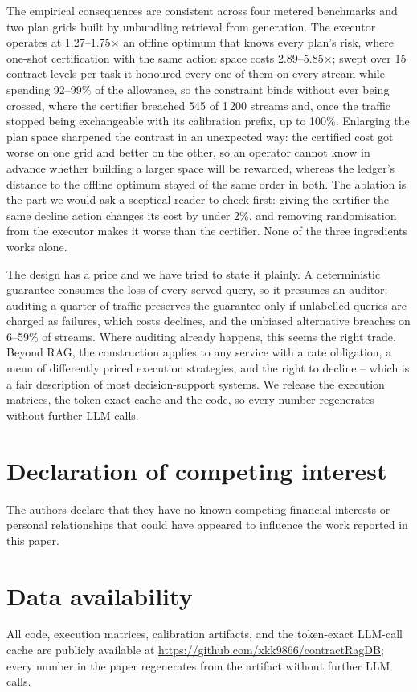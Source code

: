 \documentclass[a4paper,fleqn]{cas-dc}
\begin{document}
The empirical consequences are consistent across four metered benchmarks
and two plan grids built by unbundling retrieval from generation. The
executor operates at 1.27--1.75$\times$ an offline optimum that knows
every plan's risk, where one-shot certification with the same action
space costs 2.89--5.85$\times$; swept over 15 contract levels per task
it honoured every one of them on every stream while spending 92--99\%
of the allowance, so the constraint binds without ever being crossed,
where the certifier breached 545 of 1\,200 streams and, once the traffic
stopped being exchangeable with its calibration prefix, up to 100\%. Enlarging the plan space
sharpened the contrast in an unexpected way: the certified cost got
worse on one grid and better on the other, so an operator cannot know
in advance whether building a larger space will be rewarded, whereas the
ledger's distance to the offline optimum stayed of the same order in
both. The
ablation is the part we would ask a sceptical reader to check first:
giving the certifier the same decline action changes its cost by under
2\%, and removing randomisation from the executor makes it worse
than the certifier. None of the three ingredients works alone.

The design has a price and we have tried to state it plainly. A
deterministic guarantee consumes the loss of every served query, so it
presumes an auditor; auditing a quarter of traffic preserves the
guarantee only if unlabelled queries are charged as failures, which
costs declines, and the unbiased alternative breaches on 6--59\% of
streams. Where auditing already happens, this seems the right trade.
Beyond RAG, the construction applies to any service with a rate
obligation, a menu of differently priced execution strategies, and the
right to decline -- which is a fair description of most decision-support
systems. We release the execution matrices, the token-exact cache and
the code, so every number regenerates without further LLM calls.

\section*{Declaration of competing interest}
The authors declare that they have no known competing financial
interests or personal relationships that could have appeared to
influence the work reported in this paper.

\section*{Data availability}
All code, execution matrices, calibration artifacts, and the
token-exact LLM-call cache are publicly available at
\url{https://github.com/xkk9866/contractRagDB}; every number in the
paper regenerates from the artifact without further LLM calls.

\printcredits





\clearpage
\end{document}
